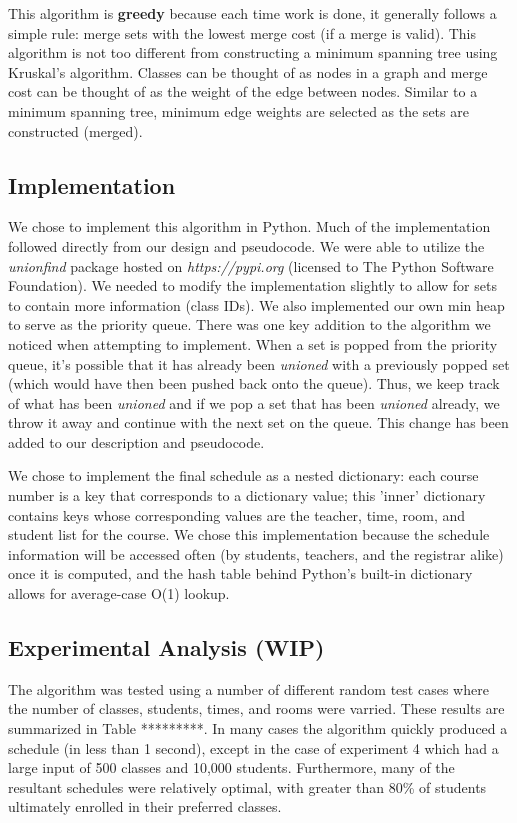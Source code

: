\documentclass[11pt, oneside]{article}   	%
\begin{document}
This algorithm is {\bf greedy} because each time work is done, it generally follows a simple rule: merge sets with the lowest merge cost (if a merge is valid). This algorithm is not too different from constructing a minimum spanning tree using Kruskal's algorithm. Classes can be thought of as nodes in a graph and merge cost can be thought of as the weight of the edge between nodes. Similar to a minimum spanning tree, minimum edge weights are selected as the sets are constructed (merged). 

\subsection{Implementation}
We chose to implement this algorithm in Python. Much of the implementation followed directly from our design and pseudocode. We were able to utilize the {\it unionfind} package hosted on {\it https://pypi.org} (licensed to The Python Software Foundation). We needed to modify the implementation slightly to allow for sets to contain more information (class IDs). We also implemented our own min heap to serve as the priority queue. There was one key addition to the algorithm we noticed when attempting to implement. When a set is popped from the priority queue, it's possible that it has already been {\it unioned} with a previously popped set (which would have then been pushed back onto the queue). Thus, we keep track of what has been {\it unioned} and if we pop a set that has been {\it unioned} already, we throw it away and continue with the next set on the queue. This change has been added to our description and pseudocode.

We chose to implement the final schedule as a nested dictionary: each course number is a key that corresponds to a dictionary value; this 'inner' dictionary contains keys whose corresponding values are the teacher, time, room, and student list for the course. We chose this implementation because the schedule information will be accessed often (by students, teachers, and the registrar alike) once it is computed, and the hash table behind Python's built-in dictionary allows for average-case O(1) lookup. \\

\subsection{Experimental Analysis (WIP)}
The algorithm was tested using a number of different random test cases where the number of classes, students, times, and rooms were varried. These results are summarized in Table *********. In many cases the algorithm quickly produced a schedule (in less than 1 second), except in the case of experiment 4 which had a large input of 500 classes and 10,000 students. Furthermore, many of the resultant schedules were relatively optimal, with greater than 80\% of students ultimately enrolled in their preferred classes. 
\end{document}
